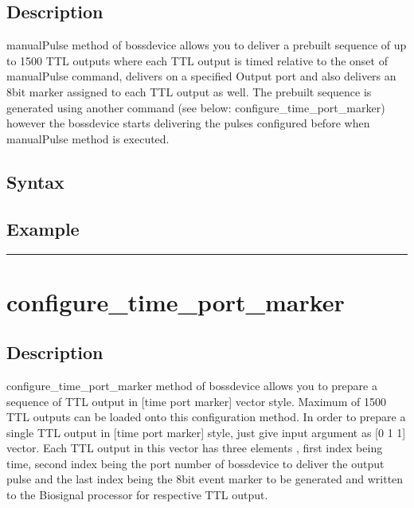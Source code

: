 \documentclass[letterpaper,10pt,english]{sphinxmanual}
\begin{document}
\subsection{Description}
\label{\detokenize{4_api_documentation:id4}}
\sphinxAtStartPar
manualPulse method of bossdevice allows you to deliver a pre\sphinxhyphen{}built sequence of up to 1500 TTL outputs where each TTL output is timed relative to the onset of manualPulse command, delivers on a specified Output port and also delivers an 8\sphinxhyphen{}bit marker assigned to each TTL output as well.
The pre\sphinxhyphen{}built sequence is generated using another command (see below: configure\_time\_port\_marker) however the bossdevice starts delivering the pulses configured before when manualPulse method is executed.


\subsection{Syntax}
\label{\detokenize{4_api_documentation:id5}}
\begin{sphinxVerbatim}[commandchars=\\\{\}]
\end{sphinxVerbatim}


\subsection{Example}
\label{\detokenize{4_api_documentation:id6}}
\begin{sphinxVerbatim}[commandchars=\\\{\}]
\end{sphinxVerbatim}


\bigskip\hrule\bigskip



\section{configure\_time\_port\_marker}
\label{\detokenize{4_api_documentation:configure-time-port-marker}}

\subsection{Description}
\label{\detokenize{4_api_documentation:id7}}
\sphinxAtStartPar
configure\_time\_port\_marker method of bossdevice allows you to prepare a sequence of TTL output in {[}time port marker{]} vector style. Maximum of 1500 TTL outputs can be loaded onto this configuration method. In order to prepare a single TTL output in {[}time port marker{]} style, just give input argument as {[}0 1 1{]} vector.
Each TTL output in this vector has three elements , first index being time, second index being the port number of bossdevice to deliver the output pulse and the last index being the 8\sphinxhyphen{}bit event marker to be generated and written to the Biosignal processor for respective TTL output.
\end{document}
